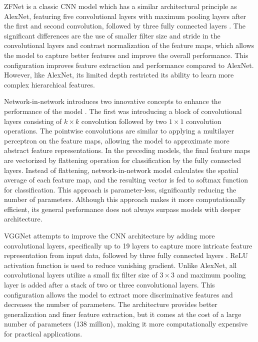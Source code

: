 \documentclass[preprint,12pt]{elsarticle}
\begin{document}
ZFNet is a classic CNN model which has a similar architectural principle as AlexNet, featuring five convolutional layers with maximum pooling layers after the first and second convolution, followed by three fully connected layers \citep{zeiler_visualizing_2013}. The significant differences are the use of smaller filter size and stride in the convolutional layers and contrast normalization of the feature maps, which allows the model to capture better features and improve the overall performance. This configuration improves feature extraction and performance compared to AlexNet. However, like AlexNet, its limited depth restricted its ability to learn more complex hierarchical features.

Network-in-network introduces two innovative concepts to enhance the performance of the model \citep{lin_network_2014}. The first was introducing a block of convolutional layers consisting of $k \times k$ convolution followed by two $1 \times 1$ convolution operations. The pointwise convolutions are similar to applying a multilayer perceptron on the feature maps, allowing the model to approximate more abstract feature representations. In the preceding models, the final feature maps are vectorized by flattening operation for classification by the fully connected layers. Instead of flattening, network-in-network model calculates the spatial average of each feature map, and the resulting vector is fed to softmax function for classification. This approach is parameter-less, significantly reducing the number of parameters. Although this approach makes it more computationally efficient, its general performance does not always surpass models with deeper architecture.

VGGNet attempts to improve the CNN architecture by adding more convolutional layers, specifically up to 19 layers to capture more intricate feature representation from input data, followed by three fully connected layers \citep{simonyan_very_2015}. ReLU activation function is used to reduce vanishing gradient. Unlike AlexNet, all convolutional layers utilize a small fix filter size of $3 \times 3$ and maximum pooling layer is added after a stack of two or three convolutional layers. This configuration allows the model to extract more discriminative features and decreases the number of parameters. The architecture provides better generalization and finer feature extraction, but it comes at the cost of a large number of parameters (138 million), making it more computationally expensive for practical applications.
\end{document}
